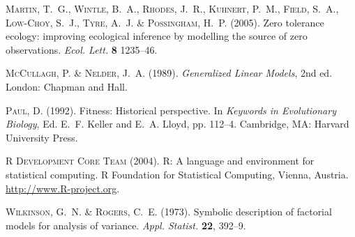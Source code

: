 \begin{thebibliography}{}
\textsc{Martin, T.~G.,
Wintle, B.~A.,
Rhodes, J.~R.,
Kuhnert, P.~M.,
Field, S.~A.,
Low-Choy, S.~J.,
Tyre, A.~J.
\&
Possingham, H.~P.}
(2005).
\newblock Zero tolerance ecology: improving ecological inference
    by modelling the source of zero observations.
\newblock \emph{Ecol. Lett.} \textbf{8} 1235--46.


\textsc{McCullagh, P. \& Nelder, J.~A.} (1989).
\newblock \emph{Generalized Linear Models}, 2nd ed.
\newblock London: Chapman and Hall.

\textsc{Paul, D.} (1992).
\newblock Fitness: Historical perspective.
\newblock In \emph{Keywords in Evolutionary Biology}, Ed. E.~F. Keller
    and E.~A. Lloyd, pp. 112--4.
\newblock Cambridge, MA: Harvard University Press.

\textsc{R Development Core Team} (2004).
\newblock R: A language and environment for statistical computing.
\newblock R Foundation for Statistical Computing, Vienna, Austria.
\newblock \url{http://www.R-project.org}.

\textsc{Wilkinson, G.~N. \& Rogers, C.~E.} (1973).
\newblock Symbolic description of factorial models for analysis of variance.
\newblock \emph{Appl. Statist.} \textbf{22}, 392--9.

\end{thebibliography}


